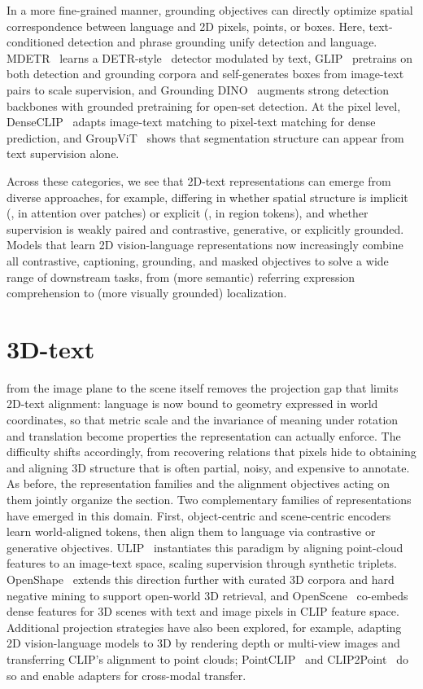 In a more fine-grained manner, grounding objectives can directly optimize spatial correspondence between language and 2D pixels, points, or boxes. Here, text-conditioned detection and phrase grounding unify detection and language. 
MDETR~\cite{kamath2021mdetr} learns a DETR-style~\cite{carion2020end} detector modulated by text, GLIP~\cite{li2022grounded} pretrains on both detection and grounding corpora and self-generates boxes from image-text pairs to scale supervision, and Grounding DINO~\cite{liu2024grounding} augments strong detection backbones with grounded pretraining for open-set detection. 
At the pixel level, DenseCLIP~\cite{rao2022denseclip} adapts image-text matching to pixel-text matching for dense prediction, and GroupViT~\cite{xu2022groupvit} shows that segmentation structure can appear from text supervision alone.

Across these categories, we see that 2D-text representations can emerge from diverse approaches, for example, differing in whether spatial structure is implicit (\eg, in attention over patches) or explicit (\eg, in region tokens), and whether supervision is weakly paired and contrastive, generative, or explicitly grounded. 
Models that learn 2D vision-language representations now increasingly combine all contrastive, captioning, grounding, and masked objectives to solve a wide range of downstream tasks, from (more semantic) referring expression comprehension to (more visually grounded) localization.

\section{3D-text}
\label{cross_modality_3d_text}
 from the image plane to the scene itself removes the projection gap that limits 2D-text alignment: language is now bound to geometry expressed in world coordinates, so that metric scale and the invariance of meaning under rotation and translation become properties the representation can actually enforce. 
The difficulty shifts accordingly, from recovering relations that pixels hide to obtaining and aligning 3D structure that is often partial, noisy, and expensive to annotate. 
As before, the representation families and the alignment objectives acting on them jointly organize the section. 
Two complementary families of representations have emerged in this domain. First, object-centric and scene-centric encoders learn world-aligned tokens, then align them to language via contrastive or generative objectives. 
ULIP~\cite{xue2023ulip} instantiates this paradigm by aligning point-cloud features to an image-text space, scaling supervision through synthetic triplets.
OpenShape~\cite{liu2023openshape} extends this direction further with curated 3D corpora and hard negative mining to support open-world 3D retrieval, and OpenScene~\cite{peng2023openscene} co-embeds dense features for 3D scenes with text and image pixels in CLIP feature space. 
Additional projection strategies have also been explored, for example, adapting 2D vision-language models to 3D by rendering depth or multi-view images and transferring CLIP's alignment to point clouds; PointCLIP~\cite{zhang2022pointclip} and CLIP2Point~\cite{huang2023clip2point} do so and enable adapters for cross-modal transfer.

